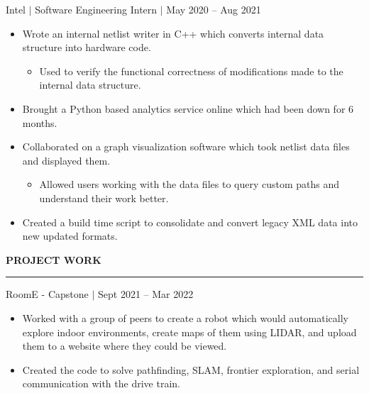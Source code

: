 \documentclass[12pt]{article}
\newcommand{\sectionRule}{\textcolor{gray}{\rule{7.27in}{0.02cm}}}
\newcommand{\sectionTxt}[1]{\noindent\textbf{#1}\\}
\newcommand{\textDate}[3]{\noindent#1 $|$ #2 $|$ {\color{textGray} #3}}
\newcommand{\projText}[2]{\noindent#1 $|$ {\color{textGray} #2}}
\begin{document}
    \textDate{Intel}{Software Engineering Intern}{May 2020 -- Aug 2021}
    \begin{small}
        \begin{itemize}
            \itemsep0em 
            \item {\color{textGray} Wrote an internal netlist writer in C++ which converts internal data structure into hardware code.}
                \begin{itemize}[label=$\circ$,topsep=-5px,partopsep=0px]
                    \itemsep0em 
                    \item {\color{textGray} Used to verify the functional correctness of modifications made to the internal data structure.}
                \end{itemize}
            \item {\color{textGray} Brought a Python based analytics service online which had been down for 6 months.}
            \item {\color{textGray} Collaborated on a graph visualization software which took netlist data files and displayed them.}
                \begin{itemize}[label=$\circ$,topsep=-5px,partopsep=0px]
                    \itemsep0em 
                    \item {\color{textGray} Allowed users working with the data files to query custom paths and understand their work better.}
                \end{itemize}
            \item {\color{textGray} Created a build time script to consolidate and convert legacy XML data into new updated formats.}
        \end{itemize}
    \end{small}

    \sectionTxt{PROJECT WORK}
    \sectionRule

    \projText{RoomE - Capstone}{Sept 2021 -- Mar 2022}
    \begin{small}
        \begin{itemize}
            \itemsep0em 
            \item {\color{textGray} Worked with a group of peers to create a robot which would automatically explore indoor environments, create maps of them using LIDAR, and upload them to a website where they could be viewed.}
            \item {\color{textGray} Created the code to solve pathfinding, SLAM, frontier exploration, and serial communication with the drive train. }
        \end{itemize}
    \end{small}
\end{document}
